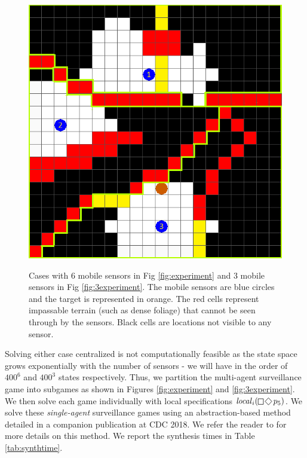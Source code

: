 \begin{figure}
{\includegraphics[scale=0.18]{figs/SGR-grid-vis-part_3.png}
\hspace{.3cm}}

\caption{Cases with 6 mobile sensors in Fig \ref{fig:experiment} and 3 mobile sensors in Fig \ref{fig:3experiment}. The mobile sensors are blue circles and the target is represented in orange. The red cells represent impassable terrain (such as dense foliage) that cannot be seen through by the sensors. Black cells are locations not visible to any sensor.}\label{fig:bigexp}\vspace{-0.5cm}
\end{figure} 

Solving either case centralized is not computationally feasible as the state space grows exponentially with the number of sensors - we will have in the order of $400^6$ and $400^3$ states respectively. Thus, we partition the multi-agent surveillance game into subgames as shown in Figures \ref{fig:experiment} and \ref{fig:3experiment}. We then solve each game individually with local specifications $\locspec_i(\LTLglobally\LTLfinally p_5)$. We solve these \emph{single-agent} surveillance games using an abstraction-based method detailed in a companion publication at CDC 2018. We refer the reader to \cite{arxiv} for more details on this method. We report the synthesis times in Table \ref{tab:synthtime}.

